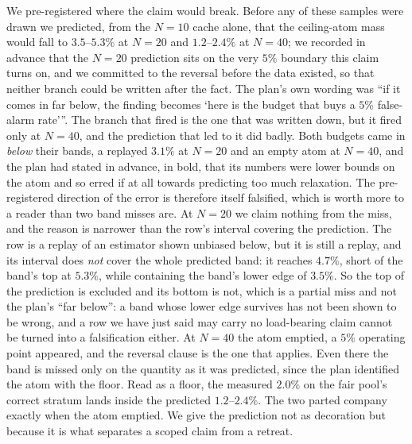 We pre-registered where the claim would break. Before any of these samples were drawn we
predicted, from the $N{=}10$ cache alone, that the ceiling-atom mass would fall to
$3.5$--$5.3\%$ at $N{=}20$ and $1.2$--$2.4\%$ at $N{=}40$; we recorded in advance that the
$N{=}20$ prediction sits on the very $5\%$ boundary this claim turns on, and we committed to
the reversal before the data existed, so that neither branch could be written after the
fact. The plan's own wording was ``if it comes in far below, the finding becomes `here is
the budget that buys a $5\%$ false-alarm rate'\thinspace''.
The branch that fired is the one that was written down, but it fired only at
$N{=}40$, and the prediction that led to it did badly. Both budgets came in \emph{below}
their bands, a replayed $3.1\%$ at $N{=}20$ and an empty atom at $N{=}40$, and the plan had
stated in advance, in bold, that its numbers were lower bounds on the atom and so erred if at
all towards predicting too much relaxation. The pre-registered direction of the error is
therefore itself falsified, which is worth more to a reader than two band misses are. At
$N{=}20$ we claim nothing from the miss, and the reason is narrower than the row's interval
covering the prediction. The row is a replay of an estimator shown unbiased below, but it is
still a replay, and its interval does \emph{not} cover the whole predicted band: it reaches
$4.7\%$, short of the band's top at $5.3\%$, while containing the band's lower edge of
$3.5\%$. So the top of the prediction is excluded and its bottom is not, which is a partial
miss and not the plan's ``far below'': a band whose lower edge survives has not been shown
to be wrong, and a row we have just said may carry no load-bearing claim cannot be turned
into a falsification either. At $N{=}40$ the atom emptied, a $5\%$ operating point appeared,
and the reversal clause is the
one that applies. Even there the band is missed only on the quantity as it was predicted,
since the plan identified the atom with the floor. Read as a floor, the measured $2.0\%$
on the fair pool's correct stratum lands inside the predicted $1.2$--$2.4\%$. The two parted
company exactly when the atom emptied. We give the prediction not as decoration but because
it is what separates a scoped claim from a retreat.

